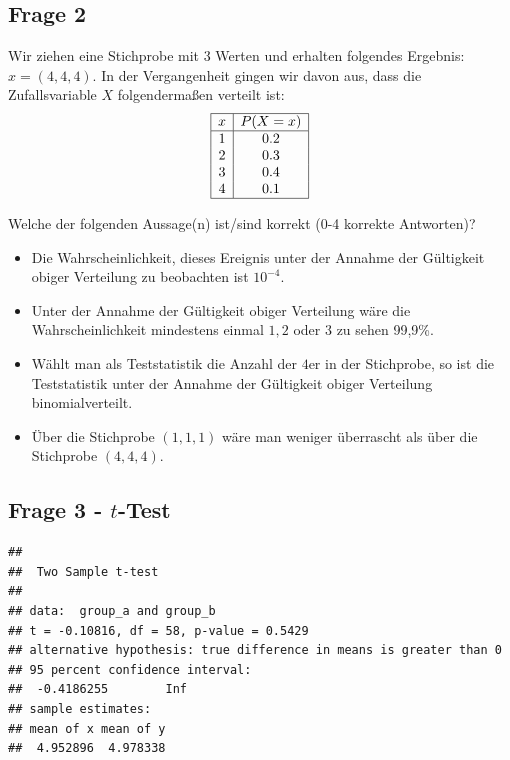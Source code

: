 \documentclass[
]{book}
\providecommand{\tightlist}{%
  \setlength{\itemsep}{0pt}\setlength{\parskip}{0pt}}
\begin{document}
\subsection{Frage 2}\label{frage-2-1}

Wir ziehen eine Stichprobe mit 3 Werten und erhalten folgendes Ergebnis: \(x = (4,4,4)\).
In der Vergangenheit gingen wir davon aus, dass die Zufallsvariable \(X\) folgendermaßen verteilt ist:
\[
\begin{array}{|c|c|}
\hline
x & P(X = x) \\
\hline
1 & 0.2 \\
2 & 0.3 \\
3 & 0.4 \\
4 & 0.1 \\
\hline
\end{array}
\]

Welche der folgenden Aussage(n) ist/sind korrekt (0-4 korrekte Antworten)?

\begin{itemize}
\tightlist
\item
  Die Wahrscheinlichkeit, dieses Ereignis unter der Annahme der Gültigkeit obiger Verteilung zu beobachten
  ist \(10^{-4}\).
\item
  Unter der Annahme der Gültigkeit obiger Verteilung wäre die Wahrscheinlichkeit mindestens einmal
  \(1,2\) oder \(3\) zu sehen 99,9\%.
\item
  Wählt man als Teststatistik die Anzahl der \(4\)er in der Stichprobe, so ist die Teststatistik
  unter der Annahme der Gültigkeit obiger Verteilung binomialverteilt.
\item
  Über die Stichprobe \((1,1,1)\) wäre man weniger überrascht als über die Stichprobe \((4,4,4)\).
\end{itemize}

\subsection{\texorpdfstring{Frage 3 - \(t\)-Test}{Frage 3 - t-Test}}\label{frage-3---t-test}

\begin{verbatim}
## 
##  Two Sample t-test
## 
## data:  group_a and group_b
## t = -0.10816, df = 58, p-value = 0.5429
## alternative hypothesis: true difference in means is greater than 0
## 95 percent confidence interval:
##  -0.4186255        Inf
## sample estimates:
## mean of x mean of y 
##  4.952896  4.978338
\end{verbatim}
\end{document}
